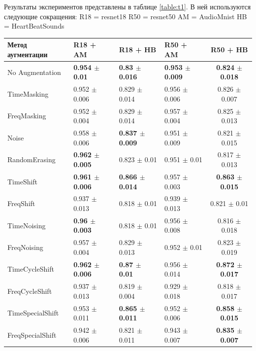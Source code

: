 \documentclass[12pt, fleqn]{article}
\begin{document}
	Результаты экспериментов представлены в таблице \ref{table:t1}. В ней используются следующие сокращения:
	\newline
	R18 = resnet18 \newline
	R50 = resnet50 \newline
	AM = AudioMnist \newline
	HB = HeartBeatSounds 
	\begin{table}[h]
		\begin{tabular}{ | l | l | l | l | c |}
			\hline
			Метод аугментации & R18 + AM & R18 + HB & R50 + AM & R50 + HB \\ \hline
			No Augmentation & \textbf{0.954 $\pm$ 0.01}  & \textbf{0.83 $\pm$ 0.016} & \textbf{0.953 $\pm$ 0.009} & \textbf{0.824 $\pm$ 0.018} \\ \hline
			TimeMasking & 0.952 $\pm$ 0.006  & 0.829 $\pm$ 0.014 & 0.956 $\pm$ 0.006 & 0.826 $\pm$ 0.007 \\ \hline
			FreqMasking & 0.952 $\pm$ 0.004  & 0.829 $\pm$ 0.014 & 0.957 $\pm$ 0.004 & 0.825 $\pm$ 0.013 \\ \hline
			Noise & 0.958 $\pm$ 0.006  & \textbf{0.837 $\pm$ 0.009} & 0.951 $\pm$ 0.009 & 0.821 $\pm$ 0.015 \\ \hline
			RandomErasing & \textbf{0.962 $\pm$ 0.005}  & 0.823 $\pm$  0.01 & 0.951 $\pm$ 0.01 & 0.817 $\pm$ 0.013 \\ \hline
			TimeShift & \textbf{0.961 $\pm$ 0.006}  & \textbf{0.866 $\pm$ 0.014} & 0.957 $\pm$ 0.003 & \textbf{0.863 $\pm$ 0.015} \\ \hline
			FreqShift & 0.937  $\pm$ 0.013  & 0.818  $\pm$ 0.01 & 0.939  $\pm$ 0.013 & 0.821  $\pm$ 0.01 \\ \hline
			TimeNoising & \textbf{0.96  $\pm$ 0.003}  & 0.818  $\pm$ 0.01 & 0.956  $\pm$ 0.008 & 0.816  $\pm$ 0.018 \\ \hline
			FreqNoising & 0.957 $\pm$ 0.004  & 0.829  $\pm$ 0.013 & 0.952  $\pm$ 0.01 & 0.823  $\pm$ 0.019 \\ \hline
			TimeCycleShift & \textbf{0.962  $\pm$ 0.006}  & \textbf{0.87  $\pm$ 0.01} & 0.956  $\pm$ 0.014 & \textbf{0.872  $\pm$ 0.017} \\ \hline
			FreqCycleShift & 0.937  $\pm$ 0.013  & 0.819  $\pm$ 0.004 & 0.929  $\pm$ 0.018 & 0.818  $\pm$ 0.017 \\ \hline
			TimeSpecialShift & 0.953  $\pm$ 0.011  & \textbf{0.865 $\pm$ 0.011} & 0.952  $\pm$ 0.006 & \textbf{0.858  $\pm$ 0.015} \\ \hline
			FreqSpecialShift & 0.942  $\pm$ 0.006  & 0.821 $\pm$ 0.011 & 0.943 $\pm$ 0.007 & \textbf{0.835 $\pm$ 0.007} \\ \hline

\end{tabular}
\end{table}
\end{document}
